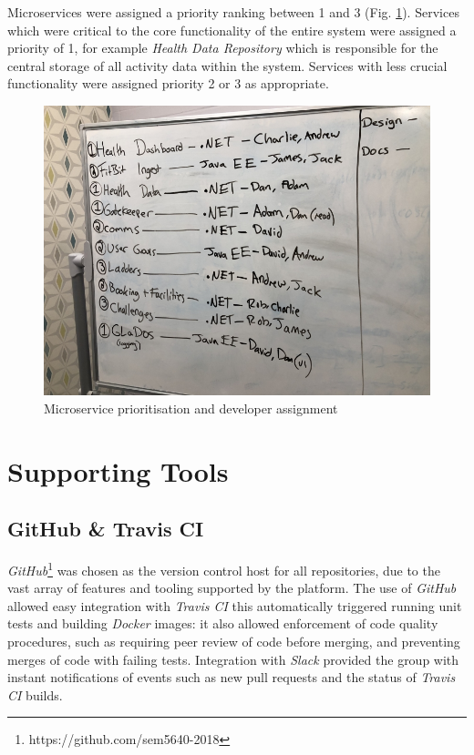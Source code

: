 Microservices were assigned a priority ranking between 1 and 3 (Fig. \ref{fig:numbering_microservice_priority}). Services which were critical to the core functionality of the entire system were assigned a priority of 1, for example \textit{Health Data Repository} which is responsible for the central storage of all activity data within the system. Services with less crucial functionality were assigned priority 2 or 3 as appropriate.

\begin{figure}[H]
    \centering
    \includegraphics[width=\textwidth]{Images/Numbering_Microservices.jpg}
    \caption{Microservice prioritisation and developer assignment}
    \label{fig:numbering_microservice_priority}
\end{figure}


\section{Supporting Tools}
\subsection{GitHub \& Travis CI}
\textit{GitHub}\footnote{https://github.com/sem5640-2018} was chosen as the version control host for all repositories, due to the vast array of features and tooling supported by the platform. The use of \textit{GitHub} allowed easy integration with \textit{Travis CI} this automatically triggered running unit tests and building \textit{Docker} images: it also allowed enforcement of code quality procedures, such as requiring peer review of code before merging, and preventing merges of code with failing tests. Integration with \textit{Slack} provided the group with instant notifications of events such as new pull requests and the status of \textit{Travis CI} builds.

